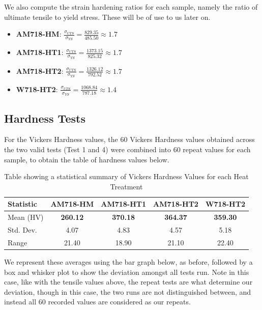 \documentclass{article}
\begin{document}
We also compute the strain hardening ratios for each sample, namely the ratio of ultimate tensile to yield stress. These will be of use to us later on.


\begin{itemize}
	\item[] \hspace{13em} \textbf{AM718-HM}: $\frac{\sigma_{UTS}}{\sigma_{YS}} = \frac{829.35}{485.50} \approx 1.7$
	\item[] \hspace{13em} \textbf{AM718-HT1}:  $\frac{\sigma_{UTS}}{\sigma_{YS}} = \frac{1373.15}{825.32} \approx 1.7$
	\item[] \hspace{13em} \textbf{AM718-HT2}:  $\frac{\sigma_{UTS}}{\sigma_{YS}} = \frac{1326.12}{792.52} \approx 1.7$
	\item[] \hspace{13em} \textbf{W718-HT2}:  $\frac{\sigma_{UTS}}{\sigma_{YS}} = \frac{1068.84}{787.18} \approx 1.4$
\end{itemize}



\subsection{Hardness Tests}

For the Vickers Hardness values, the 60 Vickers Hardness values obtained across the two valid tests (Test 1 and 4) were combined into 60 repeat values for each sample, to obtain the table of hardness values below.


\begin{table}[H]
	\centering
	\caption{Table showing a statistical summary of Vickers Hardness Values for each Heat Treatment}
	\vspace{0.5em}
	\label{tab:hardness}
	\begin{tabular}{lcccc}
		\hline
		\textbf{Statistic} & \textbf{AM718-HM} & \textbf{AM718-HT1} & \textbf{AM718-HT2} & \textbf{W718-HT2} \\
		\hline
		Mean (HV)     & \textbf{260.12} & \textbf{370.18} & \textbf{364.37} & \textbf{359.30} \\
		Std. Dev.     & 4.07  & 4.83  & 4.57  & 5.18  \\
		Range         & 21.40  & 18.90  & 21.10  & 22.40  \\
		\hline
	\end{tabular}
\end{table}

We represent these averages using the bar graph below, as before, followed by a box and whisker plot to show the deviation amongst all tests run. Note in this case, like with the tensile values above, the repeat tests are what determine our deviation, though in this case, the two runs are not distinguished between, and instead all 60 recorded values are considered as our repeats.
\end{document}
